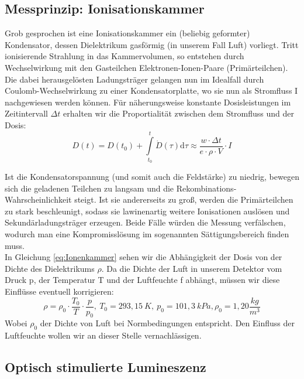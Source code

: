 \subsection{Messprinzip: Ionisationskammer}
Grob gesprochen ist eine Ionisationskammer ein (beliebig geformter) Kondensator, dessen Dielektrikum gasförmig (in unserem Fall Luft) vorliegt. Tritt ionisierende Strahlung in das Kammervolumen, so entstehen durch Wechselwirkung mit den Gasteilchen Elektronen-Ionen-Paare (Primärteilchen). Die dabei herausgelösten Ladungsträger gelangen nun im Idealfall durch Coulomb-Wechselwirkung zu einer Kondensatorplatte, wo sie nun als Stromfluss I nachgewiesen werden können. Für näherungsweise konstante Dosisleistungen im Zeitintervall $\Delta t$ erhalten wir die Proportialität zwischen dem Stromfluss und der Dosis:\\ 

\begin{equation} \label{eq:Ionenkammer}
	D(t) = D(t_0) + \int \limits_{t_0}^{t} \dot{D}(\tau) \mathrm{d}\tau \approx \frac{w \cdot \Delta t}{e \cdot \rho \cdot V} \cdot I
\end{equation}

Ist die Kondensatorspannung (und somit auch die Feldstärke) zu niedrig, bewegen sich die geladenen Teilchen zu langsam und die Rekombinations-Wahrscheinlichkeit steigt. Ist sie andererseits zu groß, werden die Primärteilchen zu stark beschleunigt, sodass sie lawinenartig weitere Ionisationen auslösen und Sekundärladungsträger erzeugen. Beide Fälle würden die Messung verfälschen, wodurch man eine Kompromisslösung im sogenannten Sättigungsbereich finden muss.\\ 

In Gleichung \ref{eq:Ionenkammer} sehen wir die Abhängigkeit der Dosis von der Dichte des Dielektrikums $\rho$. Da die Dichte der Luft in unserem Detektor vom Druck p, der Temperatur T und der Luftfeuchte f abhängt, müssen wir diese Einflüsse eventuell korrigieren:
\begin{equation}
	\rho = \rho_0 \cdot \frac{T_0}{T} \cdot \frac{p}{p_0} ,
	\ T_0 = 293,15\ K,\ p_0 = 101,3\ kPa, \rho_0 =1,20 \frac{kg}{m^3}
    \label{formel:kappa}
\end{equation}
Wobei $\rho_0$ der Dichte von Luft bei Normbedingungen entspricht. Den Einfluss der Luftfeuchte wollen wir an dieser Stelle vernachlässigen.


\subsection{Optisch stimulierte Lumineszenz}

